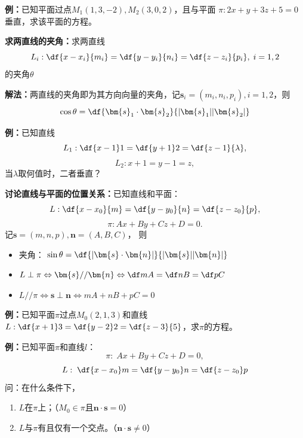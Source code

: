 {\bf 例：}已知平面过点$M_1(1,3,-2),M_2(3,0,2)$，且与平面
$\pi:2x+y+3z+5=0$垂直，求该平面的方程。

\begin{thx}
	{\bf 求两直线的夹角：}求两直线
	$$L_i:\df{x-x_i}{m_i}=\df{y-y_i}{n_i}=\df{z-z_i}{p_i},\;i=1,2$$
	的夹角$\theta$ 
	
	{\bf 解法：}两直线的夹角即为其方向向量的夹角，记$\bm{s}_i=(m_i,n_i,p_i),i=1,2$，则
	$${\cos\theta=\df{\bm{s}_1\cdot\bm{s}_2}{|\bm{s}_1||\bm{s}_2|}}$$
\end{thx}

{\bf 例：}已知直线
$$L_1:\df{x-1}1=\df{y+1}2=\df{z-1}{\lambda},$$
$$L_2:x+1=y-1=z,$$
当$\lambda$取何值时，二者垂直？

\begin{thx}
	{\bf 讨论直线与平面的位置关系：}已知直线和平面：
	$$L:\df{x-x_0}{m}=\df{y-y_0}{n}=\df{z-z_0}{p},$$
	$$\pi:Ax+By+Cz+D=0.$$ 
	记$\bm{s}=(m,n,p),\bm{n}=(A,B,C)$， 则
	\begin{itemize}
	  \item 夹角：
	  $\sin\theta=\df{|\bm{s}\cdot\bm{n}|}{|\bm{s}||\bm{n}|}$ 
	  \item $L\perp\pi \Leftrightarrow\bm{s}//\bm{n} 
	  \Leftrightarrow \df mA=\df nB=\df pC$ 
	  \item $L//\pi \Leftrightarrow\bm{s}\perp\bm{n} 
	  \Leftrightarrow mA+nB+pC=0$
	\end{itemize}
\end{thx}

{\bf 例：}已知平面$\pi$过点$M_0(2,1,3)$和直线
$L:\df{x+1}3=\df{y-2}2=\df{z-3}{5}$，求$\pi$的方程。


{\bf 例：}已知平面$\pi$和直线$l$：
$$\pi:\;Ax+By+Cz+D=0,$$
$$L:\;\df{x-x_0}m=\df{y-y_0}n=\df{z-z_0}p$$
问：在什么条件下，
\begin{enumerate}[(1)]
  \setlength{\itemindent}{1cm}
  \item $L$在$\pi$上；\hfill（$M_0\in\pi$且$\bm{n}\cdot\bm{s}=0$）
  \item $L$与$\pi$有且仅有一个交点。\hfill（$\bm{n}\cdot\bm{s}\ne0$）
\end{enumerate}

